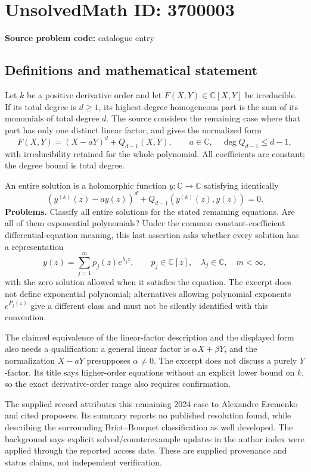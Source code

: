 \documentclass[11pt]{article}
\newcommand{\C}{\mathbb{C}}
\begin{document}
\section*{UnsolvedMath ID: 3700003}
\textbf{Source problem code:} catalogue entry
\subsection{Definitions and mathematical statement}
Let $k$ be a positive derivative order and let $F(X,Y)\in\C[X,Y]$ be irreducible. If its total degree is $d\geq1$, its highest-degree homogeneous part is the sum of its monomials of total degree $d$. The source considers the remaining case where that part has only one distinct linear factor, and gives the normalized form
\[
 F(X,Y)=(X-aY)^d+Q_{d-1}(X,Y),\qquad
 a\in\C,\quad \deg Q_{d-1}\leq d-1,
\]
with irreducibility retained for the whole polynomial. All coefficients are constant; the degree bound is total degree.

An entire solution is a holomorphic function $y:\C\to\C$ satisfying identically
\[
 (y^{(k)}(z)-ay(z))^d+Q_{d-1}(y^{(k)}(z),y(z))=0.
\]
\textbf{Problems.} Classify all entire solutions for the stated remaining equations. Are all of them exponential polynomials? Under the common constant-coefficient differential-equation meaning, this last assertion asks whether every solution has a representation
\[
 y(z)=\sum_{j=1}^{m}p_j(z)e^{\lambda_jz},\qquad
 p_j\in\C[z],\quad\lambda_j\in\C,\quad m<\infty,
\]
with the zero solution allowed when it satisfies the equation. The excerpt does not define exponential polynomial; alternatives allowing polynomial exponents $e^{P_j(z)}$ give a different class and must not be silently identified with this convention.

The claimed equivalence of the linear-factor description and the displayed form also needs a qualification: a general linear factor is $\alpha X+\beta Y$, and the normalization $X-aY$ presupposes $\alpha\ne0$. The excerpt does not discuss a purely $Y$-factor. Its title says higher-order equations without an explicit lower bound on $k$, so the exact derivative-order range also requires confirmation.

The supplied record attributes this remaining 2024 case to Alexandre Eremenko and cited proposers. Its summary reports no published resolution found, while describing the surrounding Briot--Bouquet classification as well developed. The background says explicit solved/counterexample updates in the author index were applied through the reported access date. These are supplied provenance and status claims, not independent verification.
\end{document}
